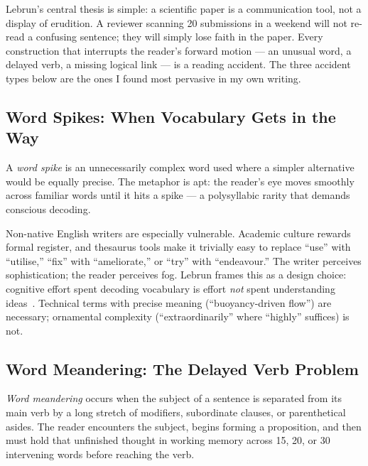 \documentclass[journal]{IEEEtran}
\begin{document}
Lebrun's central thesis is simple: a scientific paper is a communication tool, not a display of erudition. A reviewer scanning 20 submissions in a weekend will not re-read a confusing sentence; they will simply lose faith in the paper. Every construction that interrupts the reader's forward motion --- an unusual word, a delayed verb, a missing logical link --- is a reading accident. The three accident types below are the ones I found most pervasive in my own writing.

\subsection{Word Spikes: When Vocabulary Gets in the Way}

A \emph{word spike} is an unnecessarily complex word used where a simpler alternative would be equally precise. The metaphor is apt: the reader's eye moves smoothly across familiar words until it hits a spike --- a polysyllabic rarity that demands conscious decoding.

Non-native English writers are especially vulnerable. Academic culture rewards formal register, and thesaurus tools make it trivially easy to replace ``use'' with ``utilise,'' ``fix'' with ``ameliorate,'' or ``try'' with ``endeavour.'' The writer perceives sophistication; the reader perceives fog. Lebrun frames this as a design choice: cognitive effort spent decoding vocabulary is effort \emph{not} spent understanding ideas~\cite{lebrun2021}. Technical terms with precise meaning (``buoyancy-driven flow'') are necessary; ornamental complexity (``extraordinarily'' where ``highly'' suffices) is not.

\subsection{Word Meandering: The Delayed Verb Problem}

\emph{Word meandering} occurs when the subject of a sentence is separated from its main verb by a long stretch of modifiers, subordinate clauses, or parenthetical asides. The reader encounters the subject, begins forming a proposition, and then must hold that unfinished thought in working memory across 15, 20, or 30 intervening words before reaching the verb.
\end{document}
